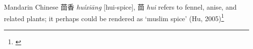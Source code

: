 \begin{etymology}\label{ety:huixiang}
Mandarin Chinese {茴香} \textit{huíxiāng} [hui-spice], 茴 \textit{hui} refers to fennel, anise, and related plants; it perhaps could be rendered as `muslim spice' (Hu, 2005)\footnote{\textcite{hu_food_2005}}
\end{etymology}